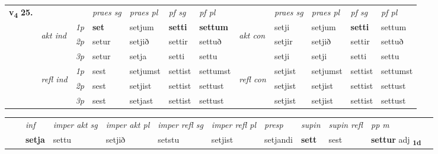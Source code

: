 \begin{tabular}{llllllllllll} \toprule
\multirow{4}{*}{{{\textbf{v{\textsubscript{4}}} \Large{\textbf{25.}}}}}  & &   &  \textit{praes sg}  & \textit{praes pl}  &\textit{ pf sg} & \textit{pf pl} &  &  \textit{praes sg}  & \textit{praes pl}  & \textit{pf sg} & \textit{pf pl } \\*
	\cmidrule{4-7} \cmidrule{9-12}
 & \multirow{3}{*}{\begin{turn}{90}\textit{akt ind}\end{turn}} & {\textit{1p}} & \textbf{set} & setjum    & \textbf{setti} & \textbf{settum} & \multirow{3}{*}{\begin{turn}{90}\textit{akt con}\end{turn}} &setji & setjum & \textbf{setti} & settum\\*
& &  {\textit{2p}} &  setur  & setjið   & settir & settuð & & setjir & setjið & settir & settuð \\*
& &  {\textit{3p}} & setur & setja   & setti & settu & & setji & setji& setti & settu  \\*
\cmidrule{4-7} \cmidrule{9-12}
 &\multirow{3}{*}{\begin{turn}{90}\textit{refl ind}\end{turn}} & {\textit{1p}} & sest & setjumst    & settist & settumst & \multirow{3}{*}{\begin{turn}{90}\textit{refl con}\end{turn}}  &setjist & setjumst & settist & settumst\\*
 &&  {\textit{2p}} &  sest  & setjist   & settist & settust & &setjist & setjist & settist & settust \\*
& &  {\textit{3p}} & sest & setjast   & settist & settust & & setjist & setjist& settist & settust  \\*
\cmidrule{4-7} \cmidrule{9-12}
\end{tabular}


\begin{tabular}{llllllllllll}
 & & \textit{inf} & \textit{imper akt sg} & \textit{imper akt pl} & \textit{imper refl sg} & \textit{imper refl pl} & \textit{presp} & \textit{supin} & \textit{supin refl} & \textit{pp m}     \\*
  & & \textbf{setja} & settu  & setjið & setstu & setjist & setjandi &  \textbf{sett} & sest & \textbf{settur} adj \textbf{\textsubscript{1d}} \\*
\cmidrule{1-12}
\end{tabular}



